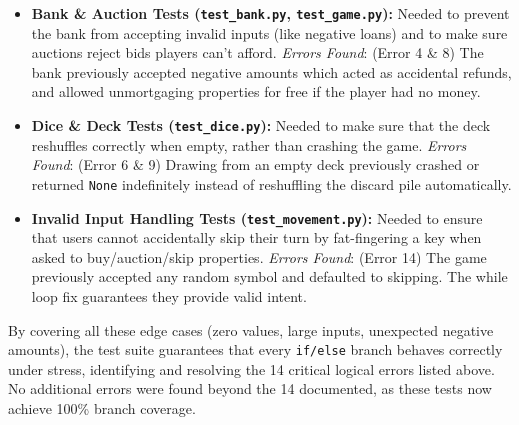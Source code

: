 \documentclass[11pt]{article}
\begin{document}
\begin{itemize}
    \item \textbf{Bank \& Auction Tests (\texttt{test\_bank.py}, \texttt{test\_game.py}):} Needed to prevent the bank from accepting invalid inputs (like negative loans) and to make sure auctions reject bids players can't afford. \textit{Errors Found}: (Error 4 \& 8) The bank previously accepted negative amounts which acted as accidental refunds, and allowed unmortgaging properties for free if the player had no money.
    
    \item \textbf{Dice \& Deck Tests (\texttt{test\_dice.py}):} Needed to make sure that the deck reshuffles correctly when empty, rather than crashing the game. \textit{Errors Found}: (Error 6 \& 9) Drawing from an empty deck previously crashed or returned \texttt{None} indefinitely instead of reshuffling the discard pile automatically.
    
    \item \textbf{Invalid Input Handling Tests (\texttt{test\_movement.py}):} Needed to ensure that users cannot accidentally skip their turn by fat-fingering a key when asked to buy/auction/skip properties. \textit{Errors Found}: (Error 14) The game previously accepted any random symbol and defaulted to skipping. The while loop fix guarantees they provide valid intent.
\end{itemize}

By covering all these edge cases (zero values, large inputs, unexpected negative amounts), the test suite guarantees that every \texttt{if/else} branch behaves correctly under stress, identifying and resolving the 14 critical logical errors listed above. No additional errors were found beyond the 14 documented, as these tests now achieve 100\% branch coverage.
\end{document}
